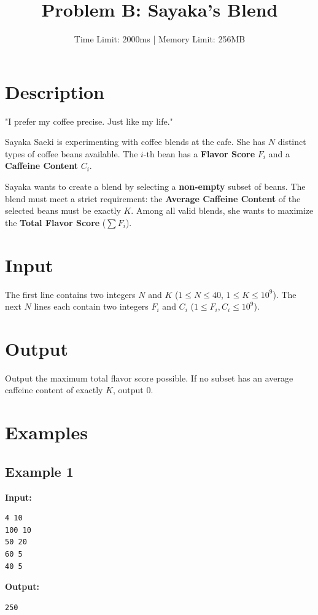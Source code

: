 \documentclass[11pt, letterpaper]{article}
\title{\textbf{Problem B: Sayaka's Blend}}
\author{Time Limit: 2000ms | Memory Limit: 256MB}
\date{}
\begin{document}
\maketitle

\section*{Description}

"I prefer my coffee precise. Just like my life."

Sayaka Saeki is experimenting with coffee blends at the cafe. She has $N$ distinct types of coffee beans available.
The $i$-th bean has a \textbf{Flavor Score} $F_i$ and a \textbf{Caffeine Content} $C_i$.

Sayaka wants to create a blend by selecting a \textbf{non-empty} subset of beans. The blend must meet a strict requirement: the \textbf{Average Caffeine Content} of the selected beans must be exactly $K$.
Among all valid blends, she wants to maximize the \textbf{Total Flavor Score} ($\sum F_i$).

\section*{Input}

The first line contains two integers $N$ and $K$ ($1 \le N \le 40$, $1 \le K \le 10^9$).
The next $N$ lines each contain two integers $F_i$ and $C_i$ ($1 \le F_i, C_i \le 10^9$).

\section*{Output}

Output the maximum total flavor score possible. If no subset has an average caffeine content of exactly $K$, output 0.

\section*{Examples}

\subsection*{Example 1}
\textbf{Input:}
\begin{verbatim}
4 10
100 10
50 20
60 5
40 5
\end{verbatim}

\textbf{Output:}
\begin{verbatim}
250
\end{verbatim}
\end{document}
